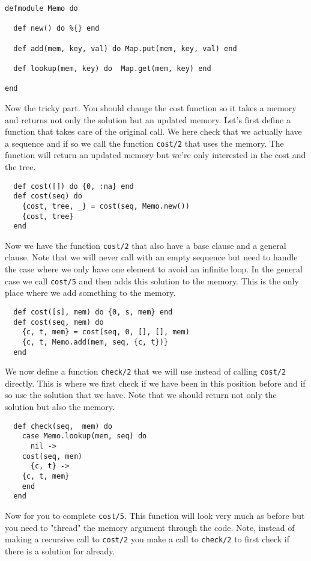 \documentclass[a4paper,11pt]{article}
\begin{document}
\begin{verbatim}
defmodule Memo do

  def new() do %{} end

  def add(mem, key, val) do Map.put(mem, key, val) end

  def lookup(mem, key) do  Map.get(mem, key) end

end
\end{verbatim}

Now the tricky part. You should change the cost function so it takes a
memory and returns not only the solution but an updated memory. Let's
first define a function that takes care of the original call. We here
check that we actually have a sequence and if so we call the function
{\tt cost/2} that uses the memory. The function will return an updated
memory but we're only interested in the cost and the tree.

\begin{verbatim}
  def cost([]) do {0, :na} end
  def cost(seq) do
    {cost, tree, _} = cost(seq, Memo.new())
    {cost, tree}
  end
\end{verbatim}


Now we have the function {\tt cost/2} that also have a base clause and
a general clause. Note that we will never call with an empty sequence
but need to handle the case where we only have one element to avoid an
infinite loop. In the general case we call {\tt cost/5} and then adds
this solution to the memory. This is the only place where we add
something to the memory.

\begin{verbatim}
  def cost([s], mem) do {0, s, mem} end
  def cost(seq, mem) do
    {c, t, mem} = cost(seq, 0, [], [], mem)
    {c, t, Memo.add(mem, seq, {c, t})}
  end  
\end{verbatim}


We now define a function {\tt check/2} that we will use instead of
calling {\tt cost/2} directly. This is where we first check if we have
been in this position before and if so use the solution that we
have. Note that we should return not only the solution but also the
memory.

\begin{verbatim}
  def check(seq,  mem) do
    case Memo.lookup(mem, seq) do
      nil ->
	cost(seq, mem)
      {c, t} ->
	{c, t, mem}
    end
  end
\end{verbatim}

Now for you to complete {\tt cost/5}. This function will look very
much as before but you need to "thread" the memory argument through
the code. Note, instead of making a recursive call to {\tt cost/2} you
make a call to {\tt check/2} to first check if there is a solution for
already.
\end{document}
